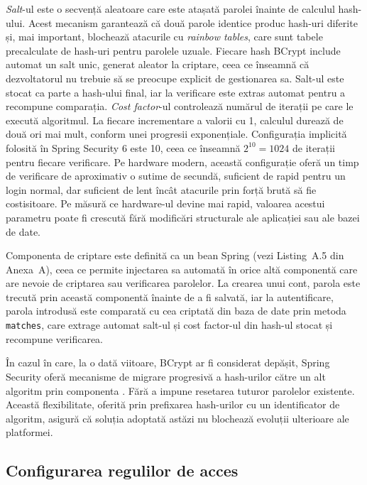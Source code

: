 \textit{Salt}-ul este o secvență aleatoare care este atașată parolei înainte
de calculul hash-ului. Acest mecanism garantează că două parole identice
produc hash-uri diferite și, mai important, blochează atacurile cu
\textit{rainbow tables}, care sunt tabele precalculate de hash-uri pentru
parolele uzuale. Fiecare hash BCrypt include automat un salt unic, generat
aleator la criptare, ceea ce înseamnă că dezvoltatorul nu trebuie să se
preocupe explicit de gestionarea sa. Salt-ul este stocat ca parte a hash-ului
final, iar la verificare este extras automat pentru a recompune comparația.\cite{Provos1999}
\textit{Cost factor}-ul controlează numărul de iterații pe care le execută
algoritmul. La fiecare incrementare a valorii cu 1, calculul durează de două
ori mai mult, conform unei progresii exponențiale. Configurația implicită
folosită în Spring Security 6 este 10, ceea ce înseamnă $2^{10} = 1024$ de
iterații pentru fiecare verificare. Pe hardware modern, această configurație
oferă un timp de verificare de aproximativ o sutime de secundă, suficient de
rapid pentru un login normal, dar suficient de lent încât atacurile prin forță
brută să fie costisitoare. Pe măsură ce hardware-ul devine mai rapid, valoarea
acestui parametru poate fi crescută fără modificări structurale ale aplicației
sau ale bazei de date.
 
Componenta de criptare este definită ca un bean Spring (vezi Listing~A.5 din
Anexa~A), ceea ce permite injectarea sa automată în orice altă componentă
care are nevoie de criptarea sau verificarea parolelor. La crearea unui cont,
parola este trecută prin această componentă înainte de a fi salvată, iar la
autentificare, parola introdusă este comparată cu cea criptată din baza de
date prin metoda \texttt{matches}, care extrage automat salt-ul și cost
factor-ul din hash-ul stocat și recompune verificarea.
 
În cazul în care, la o dată viitoare, BCrypt ar fi considerat depășit, Spring
Security oferă mecanisme de migrare progresivă a hash-urilor către un alt
algoritm prin componenta 
\texttt{}. Fără a impune
resetarea tuturor parolelor existente. Această flexibilitate, oferită prin
prefixarea hash-urilor cu un identificator de algoritm, asigură că soluția
adoptată astăzi nu blochează evoluții ulterioare ale platformei.
 

\subsection{Configurarea regulilor de acces}
\label{subsec:reguli-acces}

